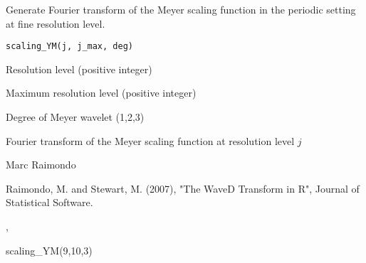 \begin{Description}\relax
Generate Fourier transform  of the Meyer scaling function in the periodic setting
at fine resolution level.
\end{Description}
\begin{Usage}
\begin{verbatim}
scaling_YM(j, j_max, deg)
\end{verbatim}
\end{Usage}
\begin{Arguments}
\begin{ldescription}
\item[\code{j}] Resolution level (positive integer) 
\item[\code{j\_max}] Maximum resolution level (positive integer)
\item[\code{deg}] Degree of Meyer wavelet (1,2,3) 
\end{ldescription}
\end{Arguments}
\begin{Value}
Fourier transform  of the Meyer scaling function at resolution level $j$
\end{Value}
\begin{Author}\relax
Marc Raimondo
\end{Author}
\begin{References}\relax
Raimondo, M. and Stewart, M. (2007),
"The WaveD Transform in R", Journal of Statistical Software.
\end{References}
\begin{SeeAlso}\relax
{},
\end{SeeAlso}
\begin{Examples}
\begin{ExampleCode}
scaling_YM(9,10,3)
\end{ExampleCode}
\end{Examples}


